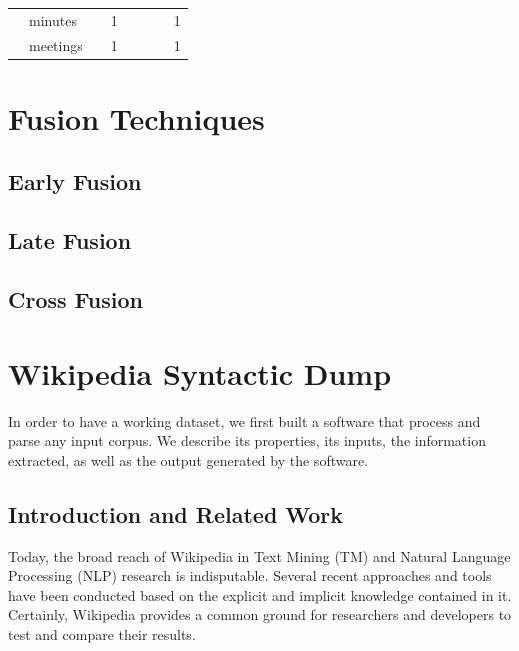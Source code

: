 \begin{table}[]
\begin{tabular}{clcccccc}
                     & minutes              &                                                                                         & 1                                                                      &                                                                   &                 &                & 1                  \\
                     & meetings             &                                                                                         & 1                                                                      &                                                                   &                 &                & 1                  \\ \hline
\end{tabular}
\end{table}


\section{Fusion Techniques}
\subsection{Early Fusion}
\subsection{Late Fusion}
\subsection{Cross Fusion}



\section{Wikipedia Syntactic Dump}
In order to have a working dataset, we first built a software that process and parse any input corpus. We describe its properties, its inputs, the information extracted, as well as the output generated by the software.



\subsection{Introduction and Related Work}
Today, the broad reach of Wikipedia in Text Mining (TM) and Natural Language Processing (NLP) research  is indisputable. Several recent approaches and tools have  been conducted based on the explicit and implicit knowledge contained in it. Certainly, Wikipedia provides a common ground for researchers and developers to test and compare their results.

